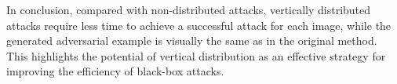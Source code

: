 

In conclusion, compared with non-distributed attacks, vertically distributed attacks require less time to achieve a successful attack for each image, while the generated adversarial example is visually the same as in the original method. This highlights the potential of vertical distribution as an effective strategy for improving the efficiency of black-box attacks.

